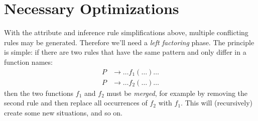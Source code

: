\documentclass[11pt]{article} %
\begin{document}
\section{Necessary Optimizations}
\label{app:optim}

With the attribute and inference rule simplifications above, multiple conflicting rules may be
generated. Therefore we'll need a \emph{left factoring} phase. The principle is simple: if there are
two rules that have the same pattern and only differ in a function names:
\begin{align*}
  P &→ …f_1(…)… \\
  P &→ …f_2(…)…
\end{align*}
then the two functions $f_1$ and $f_2$ must be \emph{merged}, for example by removing the second
rule and then replace all occurrences of $f_2$ with $f_1$. This will (recursively) create some new
situations, and so on.



\end{document}
